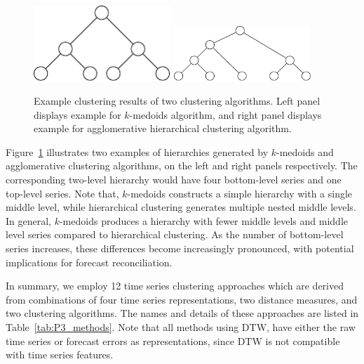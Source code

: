 \documentclass[a4paper,review,12pt,authoryear]{elsarticle}
\begin{document}
\begin{figure}[h!]
    \centering
    \vspace{0.2in}
    \includegraphics[width=0.46\textwidth]{figures/pamcluster.pdf}
    \hspace{1cm}
    \includegraphics[width=0.46\textwidth]{figures/aggcluster.pdf}
    \caption{\label{fig:cluster_example}Example clustering results of two clustering algorithms. Left panel displays example for $k$-medoids algorithm, and right panel displays example for agglomerative hierarchical clustering algorithm.}
\end{figure}
Figure~\ref{fig:cluster_example} illustrates two examples of hierarchies generated by $k$-medoids and agglomerative clustering algorithms, on the left and right panels respectively. The corresponding two-level hierarchy would have four bottom-level series and one top-level series. %
Note that, $k$-medoids constructs a simple hierarchy with a single middle level, while hierarchical clustering generates multiple nested middle levels. 
In general, $k$-medoids produces a hierarchy with fewer middle levels and middle level series compared to hierarchical clustering. As the number of bottom-level series increases, these differences become increasingly pronounced, with potential implications for forecast reconciliation.

In summary, we employ 12 time series clustering approaches which are derived from combinations of four time series representations, two distance measures, and two clustering algorithms. The names and details of these approaches are listed in Table~\ref{tab:P3_methods}. Note that all methods using DTW, have either the raw time series or forecast errors as representations, since DTW is not compatible with time series features. \\
\end{document}
